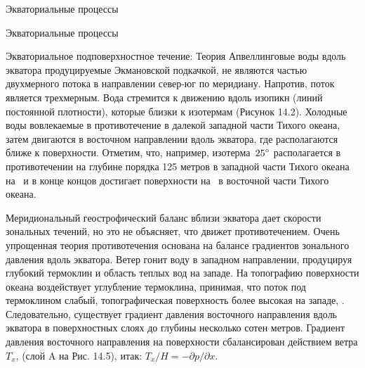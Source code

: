 \begin{chapter}{Экваториальные процессы}
\begin{section}{Экваториальные процессы}
\begin{paragraph}{Экваториальное подповерхностное течение: Теория}
Апвеллинговые воды вдоль экватора продуцируемые Экмановской подкачкой,
не являются частью двухмерного потока в направлении север-юг по
меридиану. Напротив, поток является трехмерным. Вода стремится к
движению вдоль изопикн (линий постоянной плотности), которые близки к
изотермам (Рисунок 14.2). Холодные воды вовлекаемые в противотечение в
далекой западной части Тихого океана, затем двигаются в восточном
направлении вдоль экватора, где располагаются ближе к
поверхности. Отметим, что, например, изотерма~${25}^\circ$ располагается в
противотечении на глубине порядка 125 метров в западной части Тихого
океана на~ и в конце концов достигает поверхности 
на~  в восточной части Тихого океана.
%

Меридиональный геострофический баланс вблизи экватора дает скорости
зональных течений, но это не объясняет, что движет
противотечением. Очень упрощенная теория противотечения основана на
балансе градиентов зонального давления вдоль экватора. Ветер гонит
воду в западном направлении, продуцируя глубокий термоклин и область
теплых вод на западе. На топографию поверхности океана воздействует
углубление термоклина, принимая, что поток под термоклином слабый,
топографическая поверхность более высокая на западе, .  Следовательно,
существует градиент давления восточного направления вдоль экватора в
поверхностных слоях до глубины несколько сотен метров. Градиент
давления восточного направления на поверхности сбалансирован действием
ветра $T_x$, (слой A на Рис. 14.5), итак: $T_x / H = -\partial p/\partial x$.
%


\end{paragraph}
\end{section}
\end{chapter}
